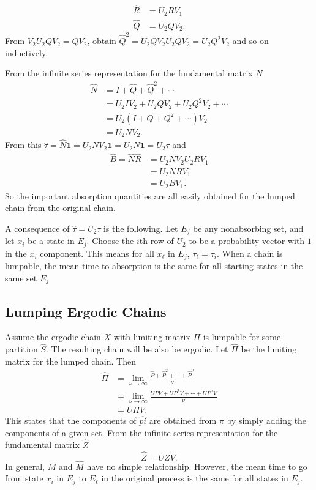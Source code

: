 \documentclass[12pt]{article}
\begin{document}
\begin{align*}
    \hat{R} &= U_2 R V_1 \\
    \hat{Q} &= U_2 Q V_2.
\end{align*}
From \( V_2 U_2 Q V_2 = Q V_2 \), obtain \( \hat{Q}^2 = U_2 Q V_2 U_2 Q
V_2 = U_2 Q^2 V_2 \) and so on inductively.

From the infinite series representation for the fundamental matrix \( N \)
\begin{align*}
    \hat{N} &= I + \hat{Q} + \hat{Q}^2 + \cdots \\
    &= U_2 I V_2+ U_2 Q V_2 + U_2 Q^2 V_2 + \cdots \\
    &= U_2 (I + Q + Q^2 + \cdots) V_2 \\
    &= U_2 N V_2.
\end{align*}
From this \( \hat{\tau} = \hat{N} \mathbf{1} = U_2 N V_2 \mathbf{1} = U_2
N \mathbf{1} = U_2 \tau \) and
\begin{align*}
    \hat{B} = \hat{N} \hat{R} &= U_2 N V_2 U_2 R V_1 \\
    &= U_2 N R V_1 \\
    &= U_2 B V_1.
\end{align*}
So the important absorption quantities are all easily obtained for the
lumped chain from the original chain.

A consequence of \( \hat{\tau} = U_2 \tau \) is the following.  Let \( E_j
\) be any nonabsorbing set, and let \( x_i \) be a state in \( E_j \).
Choose the \( i \)th row of \( U_2 \) to be a probability vector with \(
1 \) in the \( x_i \) component.  This means for all \(
x_\ell \) in \( E_j \), \( \tau_\ell = \tau_i \).  When a chain is lumpable, the mean time to
absorption is the same for all starting states in the same set \( E_j
\)

\subsection*{Lumping Ergodic Chains}

Assume the ergodic chain \( X \) with limiting matrix \( \Pi \)
is lumpable for some partition \( \hat{S} \).
The resulting chain will be also be ergodic.  Let \( \hat{\Pi} \) be the
limiting matrix for the lumped chain.  Then
\begin{align*}
    \hat{\Pi} &= \lim_{\nu \to \infty} \frac{\hat{P} + \hat{P}^2 + \cdots
    + \hat{P}^{\nu}}{\nu} \\
    &= \lim_{\nu \to \infty} \frac{UPV + UP^2V + \cdots + UP^{\nu}V}{\nu}
    \\
    & = U \Pi V.
\end{align*}
This states that the components of \( \hat{pi} \) are obtained from \(
\pi \) by simply adding the components of a given set.  From the
infinite series representation for the fundamental matrix \( \hat{Z} \)
\[
    \hat{Z} = U Z V.
\] In general, \( M \) and \( \hat{M} \) have no simple relationship.
However, the mean time to go from state \( x_i \) in \( E_j \) to \( E_{\ell}
\) in the original process is the same for all states in \( E_j \).
\end{document}
